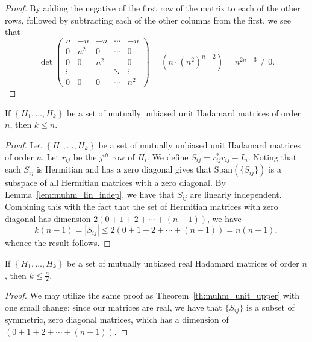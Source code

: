 \begin{lemma}
\begin{proof}
  By adding the negative of the first row of the matrix to each of the other rows, followed by subtracting each of the other columns from the first, we see that
 $$\det\left(\begin{array}{cccccc}
     n & -n & -n & \cdots & -n \\
     0 & n^2  & 0 & \cdots & 0 \\
     0 & 0 & n^2 &        & 0 \\
     \vdots &        & & \ddots & \vdots \\
     0 & 0 & 0 & \cdots & n^2
   \end{array}\right) = (n\cdot(n^2)^{n-2}) = n^{2n-3} \neq 0.$$

 \end{proof}

\end{lemma}


\begin{theorem} \label{th:muhm_unit_upper}
 If $\left\{H_1,\dots,H_k\right\}$ be a set of mutually unbiased unit Hadamard matrices of order $n$, then $k \leq n$.
 \begin{proof}
  Let $\left\{H_1,\dots,H_k\right\}$ be a set of mutually unbiased unit Hadamard matrices of order $n$. Let $r_{ij}$ be the $j^{th}$ row of $H_i$. We define $S_{ij} = r_{ij}^*r_{ij} - I_n$. Noting that each $S_{ij}$ is Hermitian and has a zero diagonal gives that $\text{Span}(\{S_{ij}\})$ is a subspace of all Hermitian matrices with a zero diagonal. By Lemma~\ref{lem:muhm_lin_indep}, we have that $S_{ij}$ are linearly independent. Combining this with the fact that the set of Hermitian matrices with zero diagonal has dimension $2(0+1+2+\cdots+(n-1))$, we have
  $$k(n-1) = |S_{ij}| \leq 2(0+1+2+\cdots+(n-1)) = n(n-1),$$
  whence the result follows.
 \end{proof}
\end{theorem}

\begin{theorem} \label{th:muhm_upper}
 If $\left\{H_1,\dots,H_k\right\}$ be a set of mutually unbiased real Hadamard matrices of order $n$, then $k \leq \frac{n}{2}$.
 \begin{proof}
  We may utilize the same proof as Theorem~\ref{th:muhm_unit_upper} with one small change: since our matrices are real, we have that $\{S_{ij}\}$ is a subset of symmetric, zero diagonal matrices, which has a dimension of $(0+1+2+\cdots+(n-1))$.
 \end{proof}

\end{theorem}

